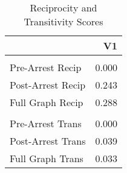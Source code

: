 \begin{table}[!h]

\caption{Reciprocity and Transitivity Scores}
\centering
\begin{tabular}[t]{lr}
\toprule
  & V1\\
\midrule
\addlinespace[0.3em]
\multicolumn{2}{l}{\textbf{Reciprocity}}\\
\hspace{1em}Pre-Arrest Recip & 0.000\\
\hspace{1em}Post-Arrest Recip & 0.243\\
\hspace{1em}Full Graph Recip & 0.288\\
\addlinespace[0.3em]
\multicolumn{2}{l}{\textbf{Transitivity}}\\
\hspace{1em}Pre-Arrest Trans & 0.000\\
\hspace{1em}Post-Arrest Trans & 0.039\\
\hspace{1em}Full Graph Trans & 0.033\\
\bottomrule
\end{tabular}
\end{table}
